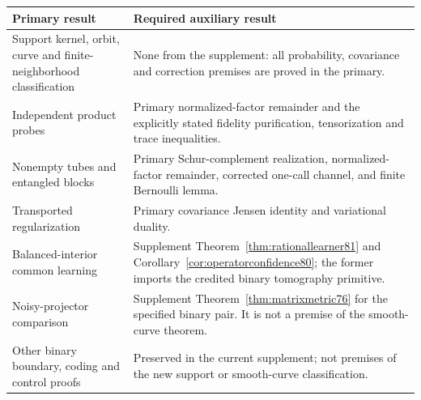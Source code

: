 \begin{center}
\begin{tabular}{@{}>{\raggedright\arraybackslash}p{}>{\raggedright\arraybackslash}p{}@{}}
\toprule
Primary result & Required auxiliary result\\
\midrule
Support kernel, orbit, curve and finite-neighborhood classification &
None from the supplement: all probability, covariance and correction
premises are proved in the primary.\\
Independent product probes &
Primary normalized-factor remainder and the explicitly stated
fidelity purification, tensorization and trace inequalities.\\
Nonempty tubes and entangled blocks &
Primary Schur-complement realization, normalized-factor remainder,
corrected one-call channel, and finite Bernoulli lemma.\\
Transported regularization &
Primary covariance Jensen identity and variational duality.\\
Balanced-interior common learning &
Supplement Theorem~\ref{thm:rationallearner81} and
Corollary~\ref{cor:operatorconfidence80}; the former imports the
credited binary tomography primitive.\\
Noisy-projector comparison &
Supplement Theorem~\ref{thm:matrixmetric76} for the specified binary
pair. It is not a premise of the smooth-curve theorem.\\
Other binary boundary, coding and control proofs &
Preserved in the current supplement; not premises of the new
support or smooth-curve classification.\\
\bottomrule
\end{tabular}
\end{center}

